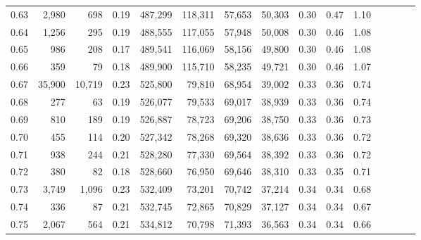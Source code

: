 \begin{tabular}{rrrcrrrrrrrrrrr}
0.63 &   2,980 &     698 &                                       0.19 &  487,299 &  118,311 &   57,653 &   50,303 &  0.30 &  0.47 &                         1.10 \\
0.64 &   1,256 &     295 &                                       0.19 &  488,555 &  117,055 &   57,948 &   50,008 &  0.30 &  0.46 &                         1.08 \\
0.65 &     986 &     208 &                                       0.17 &  489,541 &  116,069 &   58,156 &   49,800 &  0.30 &  0.46 &                         1.08 \\
0.66 &     359 &      79 &                                       0.18 &  489,900 &  115,710 &   58,235 &   49,721 &  0.30 &  0.46 &                         1.07 \\
0.67 &  35,900 &  10,719 &                                       0.23 &  525,800 &   79,810 &   68,954 &   39,002 &  0.33 &  0.36 &                         0.74 \\
0.68 &     277 &      63 &                                       0.19 &  526,077 &   79,533 &   69,017 &   38,939 &  0.33 &  0.36 &                         0.74 \\
0.69 &     810 &     189 &                                       0.19 &  526,887 &   78,723 &   69,206 &   38,750 &  0.33 &  0.36 &                         0.73 \\
0.70 &     455 &     114 &                                       0.20 &  527,342 &   78,268 &   69,320 &   38,636 &  0.33 &  0.36 &                         0.72 \\
0.71 &     938 &     244 &                                       0.21 &  528,280 &   77,330 &   69,564 &   38,392 &  0.33 &  0.36 &                         0.72 \\
0.72 &     380 &      82 &                                       0.18 &  528,660 &   76,950 &   69,646 &   38,310 &  0.33 &  0.35 &                         0.71 \\
0.73 &   3,749 &   1,096 &                                       0.23 &  532,409 &   73,201 &   70,742 &   37,214 &  0.34 &  0.34 &                         0.68 \\
0.74 &     336 &      87 &                                       0.21 &  532,745 &   72,865 &   70,829 &   37,127 &  0.34 &  0.34 &                         0.67 \\
0.75 &   2,067 &     564 &                                       0.21 &  534,812 &   70,798 &   71,393 &   36,563 &  0.34 &  0.34 &                         0.66 \\

\end{tabular}
